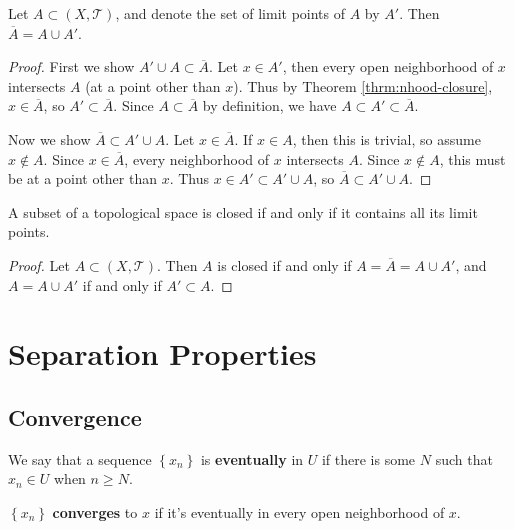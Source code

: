 \documentclass[10pt]{report}
\begin{document}
\begin{thrm}
	Let $A \subset (X,\mathcal{T})$, and denote the set of limit points of $A$ by $A'$. Then $\overline{A}=A \cup A'$.
\end{thrm}
\begin{proof}
	First we show $A' \cup A \subset \overline{A} $. Let $x \in A'$, then every open neighborhood of $x$ intersects $A$ (at a point other than $x$). Thus by Theorem \ref{thrm:nhood-closure}, $x \in \overline{A}$, so $A' \subset  \overline{A}$. Since $A \subset \overline{A}$ by definition, we have $A \subset A' \subset \overline{A}$.

	Now we show $\overline{A} \subset A' \cup A$. Let $x \in \overline{A}$. If $x \in A$, then this is trivial, so assume $x \not\in A$. Since $x \in \overline{A}$, every neighborhood of $x$ intersects $A$. Since $x \not\in A$, this must be at a point other than $x$. Thus $x \in A'\subset A' \cup A$, so $\overline{A} \subset A' \cup A$.
\end{proof}

\begin{cor}
	A subset of a topological space is closed if and only if it contains all its limit points.
\end{cor}
\begin{proof}
	Let $A \subset (X, \mathcal{T})$. Then $A$ is closed if and only if $A = \overline{A} = A \cup A'$, and $A = A \cup A'$ if and only if $A' \subset A$.
\end{proof}



\chapter{Separation Properties}


\section{Convergence}

We say that a sequence $\left\{ x_n \right\}$ is \textbf{eventually} in $U$ if there is some $N$ such that $x_n \in U$ when $n \geq N$.

\begin{defn}[]
$\left\{ x_n \right\}$ \textbf{converges} to $x$ if it's eventually in every open neighborhood of $x$.
\end{defn}
\end{document}
